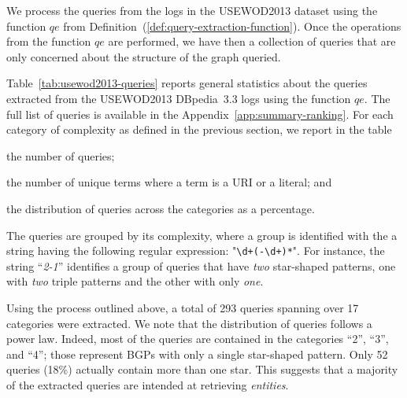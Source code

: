 We process the queries from the logs in the USEWOD2013 dataset using the function $qe$ from Definition~(\ref{def:query-extraction-function}).
Once the operations from the function $qe$ are performed, we have then a collection of queries that are only concerned about the structure of the graph queried.

Table~\ref{tab:usewod2013-queries} reports general statistics about the queries extracted from the USEWOD2013 DBpedia~3.3 logs using the function $qe$. The full list of queries is available in the Appendix~\ref{app:summary-ranking}. For each category of complexity as defined in the previous section, we report in the table
\begin{inparaenum}[(a)]
\item the number of queries;
\item the number of unique terms where a term is a URI or a literal; and
\item the distribution of queries across the categories as a percentage.
\end{inparaenum}

The queries are grouped by its complexity, where a group is identified with the a string having the following regular expression: "\verb/\d+(-\d+)*/". For instance, the string ``\emph{2-1}'' identifies a group of queries that have \textit{two} star-shaped patterns, one with \textit{two} triple patterns and the other with only \textit{one}.

Using the process outlined above, a total of 293 queries spanning over 17 categories were extracted. We note that the distribution of queries follows a power law. Indeed, most of the queries are contained in the categories ``2'', ``3'', and ``4''; those represent BGPs with only a single star-shaped pattern. Only 52 queries (18\%) actually contain more than one star. This suggests that a majority of the extracted queries are intended at retrieving \emph{entities}.

